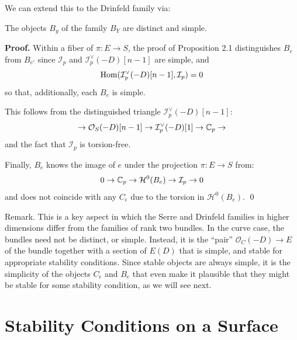 \documentclass{amsart}
\begin{document}
We can extend this to the Drinfeld family via: 

\medskip

 The objects $B_y$ of the family $B_Y$ are distinct and simple. 

\medskip

{\bf Proof.} Within a fiber of $\pi: E \rightarrow S$, the proof of Proposition 2.1 distinguishes 
$B_e$ from $B_{e'}$ since 
${\mathcal I}_p$ and ${\mathcal I}_p^\vee(-D)[n-1]$ are simple, and
\[ \mbox{Hom}({\mathcal I}_p^\vee(-D)[n-1], {\mathcal I}_p) = 0 \] 
so that, additionally, each $B_e$ is simple. 

\medskip

This follows from the distinguished triangle ${\mathcal I}_p^\vee(-D)[n-1]$:  
\[ \rightarrow {\mathcal O}_S(-D)[n-1] \rightarrow {\mathcal I}_p^\vee(-D)[1] \rightarrow {\mathbb C}_p \rightarrow \] 
and the fact that ${\mathcal I}_p$ is torsion-free. 

\medskip

Finally, $B_e$ knows the image of $e$ under the projection $\pi:E \rightarrow S$ from: 
\[ 0 \rightarrow {\mathbb C}_p \rightarrow {\mathcal H}^0(B_e) \rightarrow {\mathcal I}_p \rightarrow 0 \] 
and does not coincide with any $C_\epsilon$ due to the torsion in ${\mathcal H}^0(B_e)$. \qed

\medskip

\nt Remark. This is a key aspect in which the Serre and Drinfeld families in higher dimensions 
differ from the families of rank two bundles. In the curve case, the bundles need not be distinct, or 
simple. Instead, it is the ``pair'' ${\mathcal O}_C(-D) \rightarrow E$  of the bundle together with a section of 
$E(D)$ that is simple, and stable for appropriate stability conditions. Since stable objects are always simple, it  is the simplicity of the objects
$C_\epsilon$ and $B_e$ that even make it plausible that they might be stable for some stability condition, as we 
will see next. 

\medskip

\section{Stability Conditions on a Surface} 
\end{document}

